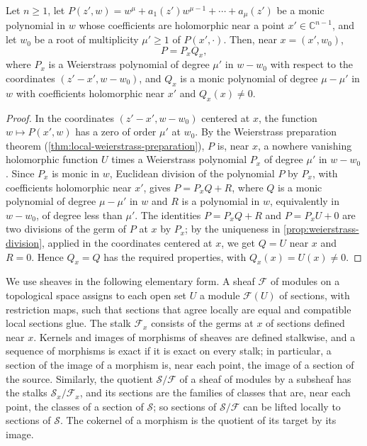 \begin{lemma}\label{lem:monic-weierstrass-factor}
Let $n\geq1$, let $P(z',w)=w^\mu+a_1(z')w^{\mu-1}+\cdots+a_\mu(z')$ be a monic polynomial in $w$ whose coefficients are holomorphic near a point $x'\in\mathbb C^{n-1}$, and let $w_0$ be a root of multiplicity $\mu'\geq1$ of $P(x',\cdot)$. Then, near $x=(x',w_0)$,
\[
 P=P_xQ_x,
\]
where $P_x$ is a Weierstrass polynomial of degree $\mu'$ in $w-w_0$ with respect to the coordinates $(z'-x',w-w_0)$, and $Q_x$ is a monic polynomial of degree $\mu-\mu'$ in $w$ with coefficients holomorphic near $x'$ and $Q_x(x)\neq0$.
\end{lemma}
\begin{proof}
In the coordinates $(z'-x',w-w_0)$ centered at $x$, the function $w\mapsto P(x',w)$ has a zero of order $\mu'$ at $w_0$. By the Weierstrass preparation theorem (\cref{thm:local-weierstrass-preparation}), $P$ is, near $x$, a nowhere vanishing holomorphic function $U$ times a Weierstrass polynomial $P_x$ of degree $\mu'$ in $w-w_0$. Since $P_x$ is monic in $w$, Euclidean division of the polynomial $P$ by $P_x$, with coefficients holomorphic near $x'$, gives $P=P_xQ+R$, where $Q$ is a monic polynomial of degree $\mu-\mu'$ in $w$ and $R$ is a polynomial in $w$, equivalently in $w-w_0$, of degree less than $\mu'$. The identities $P=P_xQ+R$ and $P=P_xU+0$ are two divisions of the germ of $P$ at $x$ by $P_x$; by the uniqueness in \cref{prop:weierstrass-division}, applied in the coordinates centered at $x$, we get $Q=U$ near $x$ and $R=0$. Hence $Q_x=Q$ has the required properties, with $Q_x(x)=U(x)\neq0$.
\end{proof}

We use sheaves in the following elementary form. A sheaf $\mathcal F$ of modules on a topological space assigns to each open set $U$ a module $\mathcal F(U)$ of sections, with restriction maps, such that sections that agree locally are equal and compatible local sections glue. The stalk $\mathcal F_x$ consists of the germs at $x$ of sections defined near $x$. Kernels and images of morphisms of sheaves are defined stalkwise, and a sequence of morphisms is exact if it is exact on every stalk; in particular, a section of the image of a morphism is, near each point, the image of a section of the source. Similarly, the quotient $\mathcal S/\mathcal F$ of a sheaf of modules by a subsheaf has the stalks $\mathcal S_x/\mathcal F_x$, and its sections are the families of classes that are, near each point, the classes of a section of $\mathcal S$; so sections of $\mathcal S/\mathcal F$ can be lifted locally to sections of $\mathcal S$. The cokernel of a morphism is the quotient of its target by its image.

